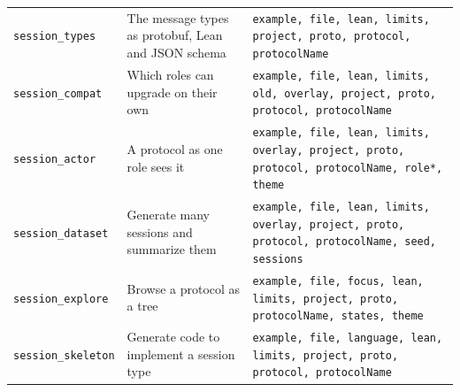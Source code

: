 {\begin{tabular}{@{}p{}p{}p{}@{}}
\texttt{session\_\allowbreak{}types} & The message types as protobuf, Lean and JSON schema & \texttt{example, file, lean, limits, project, proto, protocol, protocolName} \\
\texttt{session\_\allowbreak{}compat} & Which roles can upgrade on their own & \texttt{example, file, lean, limits, old, overlay, project, proto, protocol, protocolName} \\
\texttt{session\_\allowbreak{}actor} & A protocol as one role sees it & \texttt{example, file, lean, limits, overlay, project, proto, protocol, protocolName, role*, theme} \\
\texttt{session\_\allowbreak{}dataset} & Generate many sessions and summarize them & \texttt{example, file, lean, limits, overlay, project, proto, protocol, protocolName, seed, sessions} \\
\texttt{session\_\allowbreak{}explore} & Browse a protocol as a tree & \texttt{example, file, focus, lean, limits, project, proto, protocolName, states, theme} \\
\texttt{session\_\allowbreak{}skeleton} & Generate code to implement a session type & \texttt{example, file, language, lean, limits, project, proto, protocol, protocolName} \\
\bottomrule
\end{tabular}}
